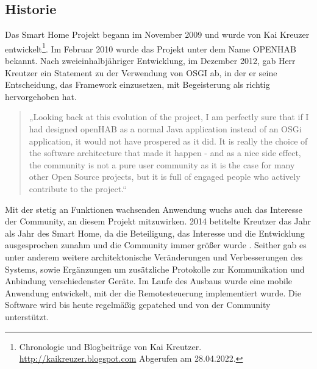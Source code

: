 \subsection*{Historie}
\label{sec:historyoHAB}
    Das Smart Home Projekt begann im November 2009 und wurde von Kai Kreuzer entwickelt\footnote{Chronologie und Blogbeiträge von Kai Kreutzer. \url{http://kaikreuzer.blogspot.com} Abgerufen am 28.04.2022.}. 
    Im Februar 2010 wurde das Projekt unter dem Name \acs{OPENHAB} bekannt. Nach zweieinhalbjähriger Entwicklung, im Dezember 2012, 
    gab Herr Kreutzer ein Statement zu der Verwendung von \acs{OSGI} ab, in der er seine Entscheidung, das Framework einzusetzen, mit Begeisterung 
    als richtig hervorgehoben hat.
    \begin{quote}
        „Looking back at this evolution of the project, I am perfectly sure that if I had designed openHAB as a normal Java 
        application instead of an OSGi application, it would not have prospered as it did. It is really the choice of the 
        software architecture that made it happen - and as a nice side effect, the community is not a pure user community 
        as it is the case for many other Open Source projects, but it is full of engaged people who actively contribute to the 
        project.\cite{kaikreutzer2012}“
    \end{quote} 
Mit der stetig an Funktionen wachsenden Anwendung wuchs auch das Interesse der Community, an diesem Projekt mitzuwirken. 2014 betitelte 
Kreutzer das Jahr als Jahr des Smart Home, da die Beteiligung, das Interesse und die Entwicklung ausgesprochen zunahm und die Community immer 
größer wurde \cite{kaikreutzer2014}. Seither gab es unter anderem weitere architektonische Veränderungen und Verbesserungen des Systems, sowie Ergänzungen um 
zusätzliche Protokolle zur Kommunikation und Anbindung verschiedenster Geräte. Im Laufe des Ausbaus wurde eine mobile Anwendung entwickelt, mit der die Remotesteuerung 
implementiert wurde. Die Software wird bis heute regelmäßig gepatched und von der Community unterstützt.

